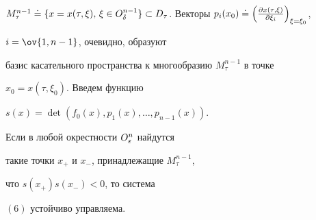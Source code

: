 $M^{n-1}_{\tau}\de\{x=x(\tau,\xi),\,\xi\in O^{n-1}_{\delta}\}\subset


D_{\tau}$. Векторы $p_i(x_0)\de\left(\frac{\Pt


x(\tau,\xi)}{\Pt\xi_i}\right)_{\xi=\xi_0}$,


$i=\ov {1,n-1}$, очевидно, образуют


базис касательного пространства к многообразию $M^{n-1}_{\tau}$ в точке


$x_0=x(\tau,\xi_0)$.  Введем функцию


$s(x)=\det (f_0(x),p_1(x),\dotsc,p_{n-1}(x))$.





\begin{lem}


Если в любой окрестности $O_{\varepsilon}^n$ найдутся


такие точки $x_{+}$ и $x_{-}$, принадлежащие $M^{n-1}_{\tau}$,


что $s(x_{+})s(x_{-})<0$, то система


$(6)$ устойчиво управляема.


\end{lem}






